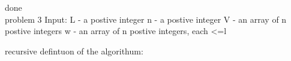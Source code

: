 \documentclass[12pt]{article}
\begin{document}
\hspace{3cm}{if [d[k,j] $>$  d[k-1] + w[kj]]then }\\

\hspace{4cm}{d[j] = d[k-1] + w[k,j]}\\

\hspace{3cm}{fi}\\

\hspace{2cm}{fi}\\

\hspace{1cm}{do}\\
  
\hspace{2cm}{if [w[k,j] $! =$  INF] then }\\
  
\hspace{3cm}{d[k,j] = d[k-1,j]}\\

\hspace{3cm}{if [d[k,j] $>$ d[k]+w[k,j]] then}\\

\hspace{4cm}{if 1$\leq$ k $\leq$ j then}\\

\hspace{5cm}{d[j]=d[k-1]+w[k,j]}\\

\hspace{4cm}{fi}\\

\hspace{3cm}{fi}\\

\hspace{2cm}{fi}\\

\hspace{1cm}{done}\\

\hspace{1cm}{return d[j]}\\

done\\

problem 3
Input:
L - a postive integer 
n - a postive integer
V - an array of n postive integers
w - an array of n postive integers, each <=l

recursive defintuon of the algorithum:
\end{document}
